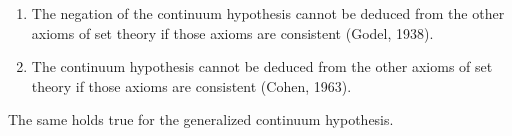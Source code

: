 \begin{enumerate}
\item[(a)] The negation of the continuum hypothesis cannot be deduced from the other axioms of set theory if those axioms are consistent (Godel, 1938).
\item[(b)] The continuum hypothesis cannot be deduced from the other axioms of set theory if those axioms are consistent (Cohen, 1963).
\end{enumerate}
The same holds true for the generalized continuum hypothesis.

